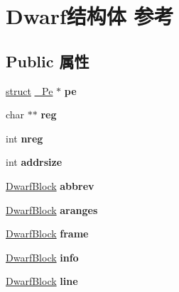\hypertarget{struct_dwarf}{}\section{Dwarf结构体 参考}
\label{struct_dwarf}
\subsection*{Public 属性}
\begin{DoxyCompactItemize}
\item 
\mbox{\label{struct_dwarf_a80531c173bcfd3415330b7fdb29d5c8b}} 
\hyperlink{interfacestruct}{struct} \hyperlink{struct___pe}{\+\_\+\+Pe} $\ast$ {\bfseries pe}
\item 
\mbox{\label{struct_dwarf_ad42718556c867697e12eb9206058c01f}} 
char $\ast$$\ast$ {\bfseries reg}
\item 
\mbox{\label{struct_dwarf_ade5f93234b567e706fe47474db80c152}} 
int {\bfseries nreg}
\item 
\mbox{\label{struct_dwarf_aafbd7cc643b8295dfcb7c27fa52dbbc5}} 
int {\bfseries addrsize}
\item 
\mbox{\label{struct_dwarf_af4d62867103e9aeaf86517030a3cea60}} 
\hyperlink{struct_dwarf_block}{Dwarf\+Block} {\bfseries abbrev}
\item 
\mbox{\label{struct_dwarf_a0867b56406400e41d96184c631385672}} 
\hyperlink{struct_dwarf_block}{Dwarf\+Block} {\bfseries aranges}
\item 
\mbox{\label{struct_dwarf_ab91e46dc50d62415577cd6bcb6ea86d0}} 
\hyperlink{struct_dwarf_block}{Dwarf\+Block} {\bfseries frame}
\item 
\mbox{\label{struct_dwarf_a3a2e38d9bbb71b0e076b2223e6dbe253}} 
\hyperlink{struct_dwarf_block}{Dwarf\+Block} {\bfseries info}
\item 
\mbox{\label{struct_dwarf_a1add3bec2027a180da385a82a972b35d}} 
\hyperlink{struct_dwarf_block}{Dwarf\+Block} {\bfseries line}
\item 
\mbox{\label{struct_dwarf_a5f5133230d72b4123bae15be6982eef6}} 
$$
\end{DoxyCompactItemize}
